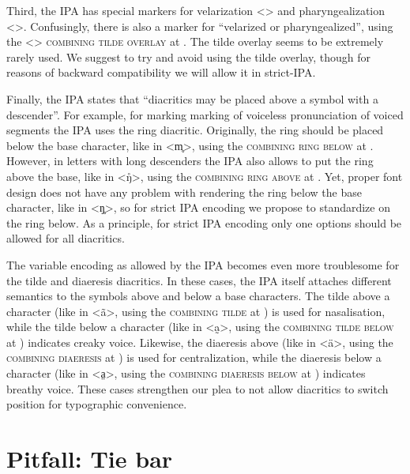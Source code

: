 Third, the IPA has special markers for velarization <> and
pharyngealization <>. Confusingly, there is also a marker for
``velarized or pharyngealized'', using the <> \textsc{combining tilde
overlay} at . The tilde overlay seems to be extremely rarely used. We 
suggest to try and avoid using the tilde overlay, though for reasons of backward 
compatibility we will allow it in strict-IPA.\@

Finally, the IPA states that ``diacritics may be placed above a symbol with a
descender''. For example, for marking marking of voiceless pronunciation of
voiced segments the IPA uses the ring diacritic. Originally, the ring should be
placed below the base character, like in <m̥>, using the \textsc{combining ring
below} at . However, in letters with long descenders the IPA also
allows to put the ring above the base, like in <ŋ̊>, using the \textsc{combining
ring above} at . Yet, proper font design does not have any problem
with rendering the ring below the base character, like in <ŋ̥>, so for strict
IPA encoding we propose to standardize on the ring below. As a principle, for
strict IPA encoding only one options should be allowed for all diacritics.

The variable encoding as allowed by the IPA becomes even more troublesome for
the tilde and diaeresis diacritics. In these cases, the IPA itself attaches
different semantics to the symbols above and below a base characters. The tilde
above a character (like in <ã>, using the \textsc{combining tilde} at
) is used for nasalisation, while the tilde below a character (like in
<a̰>, using the \textsc{combining tilde below} at ) indicates creaky
voice. Likewise, the diaeresis above (like in <ä>, using the \textsc{combining
diaeresis} at ) is used for centralization, while the diaeresis below
a character (like in <a̤>, using the \textsc{combining diaeresis below} at
) indicates breathy voice. These cases strengthen our plea to not
allow diacritics to switch position for typographic convenience.

\section{Pitfall: Tie bar}
\label{pitfall-tie-bar}

